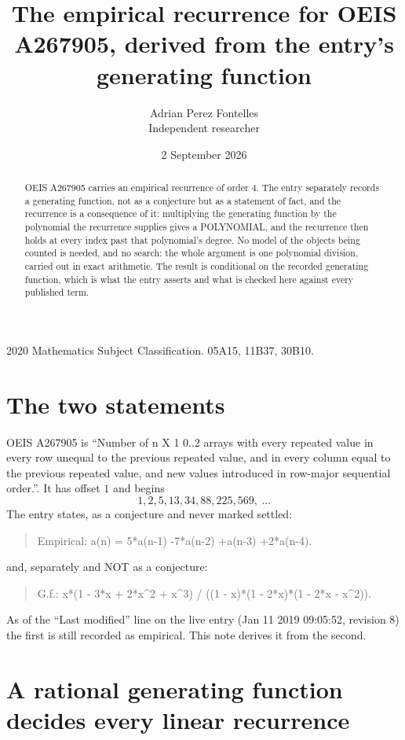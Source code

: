 \documentclass[11pt,a4paper]{article}
\title{The empirical recurrence for OEIS A267905, derived from the entry's generating function}
\author{Adrian Perez Fontelles\\ \small Independent researcher}
\date{2 September 2026}
\theoremstyle{plain}
\theoremstyle{definition}
\begin{document}
\maketitle

\begin{abstract}
OEIS A267905 carries an empirical recurrence of order $4$. The entry separately records a
generating function, not as a conjecture but as a statement of fact, and the recurrence is a
consequence of it: multiplying the generating function by the polynomial the recurrence
supplies gives a POLYNOMIAL, and the recurrence then holds at every index past that
polynomial's degree. No model of the objects being counted is needed, and no search: the
whole argument is one polynomial division, carried out in exact arithmetic. The result is
conditional on the recorded generating function, which is what the entry asserts and what is
checked here against every published term.
\end{abstract}

\noindent\small 2020 Mathematics Subject Classification. 05A15, 11B37, 30B10.\normalsize

\section{The two statements}

OEIS A267905 is ``Number of n X 1 0..2 arrays with every repeated value in every row unequal to the previous repeated value, and in every column equal to the previous repeated value, and new values introduced in row-major sequential order.''. It has offset $1$ and begins
\[
1, 2, 5, 13, 34, 88, 225, 569,\ \dots
\]
The entry states, as a conjecture and never marked settled:
\begin{quote}
Empirical: a(n) = 5*a(n-1) -7*a(n-2) +a(n-3) +2*a(n-4).
\end{quote}
and, separately and NOT as a conjecture:
\begin{quote}
G.f.: x*(1 - 3*x + 2*x\^{}2 + x\^{}3) / ((1 - x)*(1 - 2*x)*(1 - 2*x - x\^{}2)).
\end{quote}
As of the ``Last modified'' line on the live entry (Jan 11 2019 09:05:52, revision 8) the first is still
recorded as empirical. This note derives it from the second.

\section{A rational generating function decides every linear recurrence}
\end{document}
